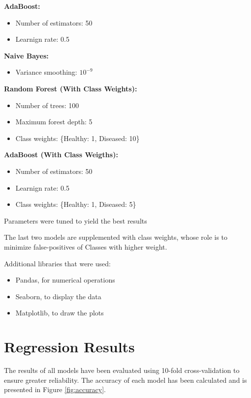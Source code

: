 \documentclass[conference]{IEEEtran}
\begin{document}
\textbf{AdaBoost:}
\begin{itemize}
    \item Number of estimators: 50
    \item Learnign rate: 0.5
\end{itemize}

\textbf{Naive Bayes:}
\begin{itemize}
    \item Variance smoothing: $10^{-9}$
\end{itemize}

\textbf{Random Forest (With Class Weights):}
\begin{itemize}
    \item Number of trees: 100
    \item Maximum forest depth: 5
    \item Class weights: \{Healthy: 1, Diseased: 10\}
\end{itemize}

\textbf{AdaBoost (With Class Weigths):}
\begin{itemize}
    \item Number of estimators: 50
    \item Learnign rate: 0.5
    \item Class weights: \{Healthy: 1, Diseased: 5\}
\end{itemize}

Parameters were tuned to yield the best results %

The last two models are supplemented with class weights, whose role is to minimize false-positives of Classes with higher weight.

Additional libraries that were used:
\begin{itemize}
    \item Pandas, for numerical operations
    \item Seaborn, to display the data
    \item Matplotlib, to draw the plots
\end{itemize}

\section{Regression Results}

The results of all models have been evaluated using 10-fold cross-validation to ensure greater reliability.
The accuracy of each model has been calculated and is presented in Figure \ref{fig:accuracy}. 
\end{document}
